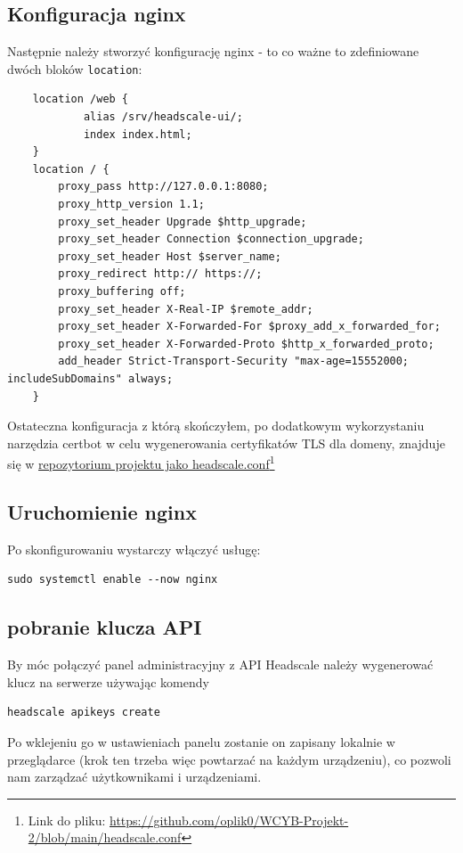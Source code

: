 \documentclass{report}
\numberwithin{equation}{section}
\begin{document}
\begin{samepage}    
\subsection{Konfiguracja nginx}
Następnie należy stworzyć konfigurację nginx - to co ważne to zdefiniowane dwóch bloków \texttt{location}:
\begin{verbatim}
    location /web {
            alias /srv/headscale-ui/;
            index index.html;
    }
    location / {
        proxy_pass http://127.0.0.1:8080;
        proxy_http_version 1.1;
        proxy_set_header Upgrade $http_upgrade;
        proxy_set_header Connection $connection_upgrade;
        proxy_set_header Host $server_name;
        proxy_redirect http:// https://;
        proxy_buffering off;
        proxy_set_header X-Real-IP $remote_addr;
        proxy_set_header X-Forwarded-For $proxy_add_x_forwarded_for;
        proxy_set_header X-Forwarded-Proto $http_x_forwarded_proto;
        add_header Strict-Transport-Security "max-age=15552000; includeSubDomains" always;
    }
\end{verbatim}
Ostateczna konfiguracja z którą skończyłem, po dodatkowym wykorzystaniu narzędzia certbot w celu wygenerowania certyfikatów TLS dla domeny, znajduje się w \href{https://github.com/oplik0/WCYB-Projekt-2/blob/main/headscale.conf}{repozytorium projektu jako headscale.conf}\footnote{Link do pliku: \url{https://github.com/oplik0/WCYB-Projekt-2/blob/main/headscale.conf}}
\end{samepage}

\subsection{Uruchomienie nginx}

Po skonfigurowaniu wystarczy włączyć usługę:
\begin{verbatim}
sudo systemctl enable --now nginx
\end{verbatim}

\subsection{pobranie klucza API}
By móc połączyć panel administracyjny z API Headscale należy wygenerować klucz na serwerze używając komendy
\begin{verbatim}
headscale apikeys create
\end{verbatim}
Po wklejeniu go w ustawieniach panelu zostanie on zapisany lokalnie w przeglądarce (krok ten trzeba więc powtarzać na każdym urządzeniu), co pozwoli nam zarządzać użytkownikami i urządzeniami.
\end{document}
